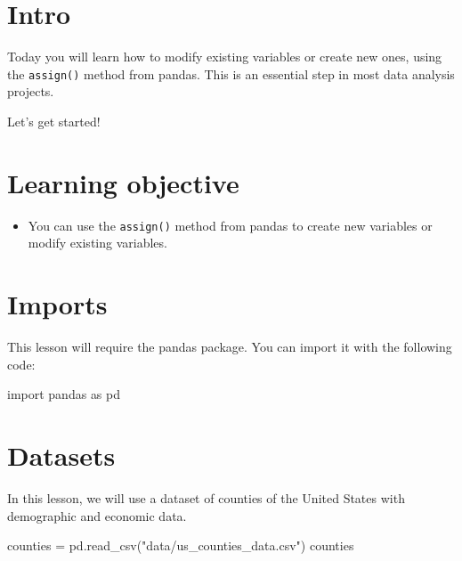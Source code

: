 \documentclass[
  letterpaper,
  DIV=11,
  numbers=noendperiod]{scrreprt}
\newenvironment{Shaded}{\begin{snugshade}}{\end{snugshade}}
\newcommand{\ImportTok}[1]{\textcolor[rgb]{0.00,0.46,0.62}{#1}}
\newcommand{\NormalTok}[1]{\textcolor[rgb]{0.00,0.23,0.31}{#1}}
\newcommand{\OperatorTok}[1]{\textcolor[rgb]{0.37,0.37,0.37}{#1}}
\newcommand{\StringTok}[1]{\textcolor[rgb]{0.13,0.47,0.30}{#1}}
\providecommand{\tightlist}{%
  \setlength{\itemsep}{0pt}\setlength{\parskip}{0pt}}\usepackage{longtable,booktabs,array}
\begin{document}
\section{Intro}\label{intro-3}

Today you will learn how to modify existing variables or create new
ones, using the \texttt{assign()} method from pandas. This is an
essential step in most data analysis projects.

Let's get started!

\section{Learning objective}\label{learning-objective}

\begin{itemize}
\tightlist
\item
  You can use the \texttt{assign()} method from pandas to create new
  variables or modify existing variables.
\end{itemize}

\section{Imports}\label{imports-3}

This lesson will require the pandas package. You can import it with the
following code:

\begin{Shaded}
\begin{Highlighting}[]
\ImportTok{import}\NormalTok{ pandas }\ImportTok{as}\NormalTok{ pd}
\end{Highlighting}
\end{Shaded}

\section{Datasets}\label{datasets}

In this lesson, we will use a dataset of counties of the United States
with demographic and economic data.

\begin{Shaded}
\begin{Highlighting}[]
\NormalTok{counties }\OperatorTok{=}\NormalTok{ pd.read\_csv(}\StringTok{"data/us\_counties\_data.csv"}\NormalTok{)}
\NormalTok{counties}
\end{Highlighting}
\end{Shaded}
\end{document}
